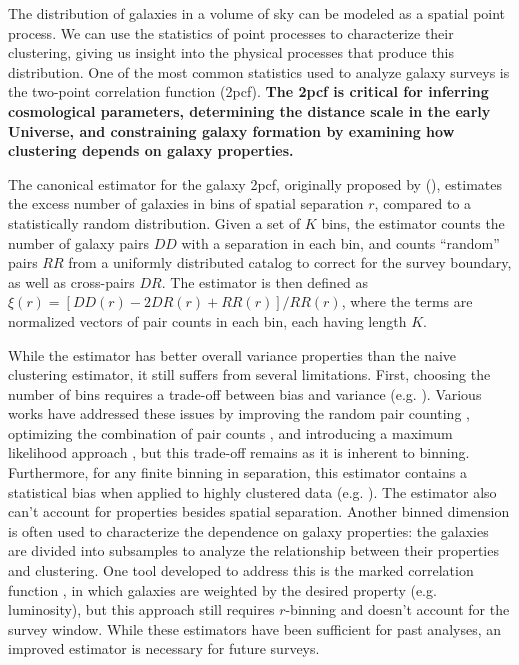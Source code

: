 \documentclass[12pt, fullpage, letterpaper]{article}
\newcommand{\cf}{2pcf\xspace}
\newcommand{\LS}{\acronym{LS}\xspace}
\begin{document}
The distribution of galaxies in a volume of sky can be modeled as a spatial point process.
We can use the statistics of point processes to characterize their clustering, giving us insight into the physical processes that produce this distribution.
One of the most common statistics used to analyze galaxy surveys is the two-point correlation function (\cf). 
\textbf{The \cf is critical for inferring cosmological parameters, determining the distance scale in the early Universe, and constraining galaxy formation by examining how clustering depends on galaxy properties.}
 
The canonical estimator for the galaxy \cf, originally proposed by \cite{LandySzalay1993} (\LS), estimates the excess number of galaxies in bins of spatial separation $r$, compared to a statistically random distribution.
Given a set of $K$ bins, the \LS estimator counts the number of galaxy pairs $DD$ with a separation in each bin, and counts ``random'' pairs $RR$ from a uniformly distributed catalog  to correct for the survey boundary, as well as cross-pairs $DR$.
The estimator is then defined as $\xi(r) = [DD(r) - 2DR(r) + RR(r)]/RR(r)$,
where the terms are normalized vectors of pair counts in each bin, each having length $K$.

While the \LS estimator has better overall variance properties than the naive clustering estimator, it still suffers from several limitations. 
First, choosing the number of bins requires a trade-off between bias and variance (e.g. \citealt{Bailoni2016}).
Various works have addressed these issues by improving the random pair counting \citep{Demina2016}, optimizing the combination of pair counts \citep{VargasMagana2013}, and introducing a maximum likelihood approach \citep{BaxterRozo2013}, but this trade-off remains as it is inherent to binning.
Furthermore, for any finite binning in separation, this estimator contains a statistical bias when applied to highly clustered data (e.g. \citealt{Kerscher1998}). The \LS estimator also can't account for properties besides spatial separation.
Another binned dimension is often used to characterize the dependence
on galaxy properties: the galaxies are divided into subsamples to
analyze the relationship between their properties and clustering.
One tool developed to address this is the marked correlation function \citep{WhitePadmanabhan2009}, in which galaxies are weighted by the desired property (e.g. luminosity), but this approach still requires $r$-binning and doesn't account for the survey window.
While these estimators have been sufficient for past analyses, an improved estimator is necessary for future surveys.
\end{document}
